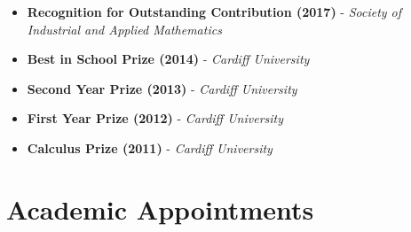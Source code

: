 \documentclass[10pt,a4paper,sans]{moderncv}        %
\begin{document}
		\begin{itemize}
			
			\item{\textbf{Recognition for Outstanding Contribution (2017)} - \small{\textit{Society of Industrial and Applied Mathematics}}}
			
			\vspace{6pt}
			
			\item{\textbf{Best in School Prize (2014)} - \small{\textit{Cardiff University}}}
			
			\vspace{6pt}
			
			\item{\textbf{Second Year Prize (2013)} - \small{\textit{Cardiff University}}}
			
			\vspace{6pt}
			
			\item{\textbf{First Year Prize (2012)} - \small{\textit{Cardiff University}}}
			
			\vspace{6pt}
			
			\item{\textbf{Calculus Prize (2011)} - \small{\textit{Cardiff University}}}
			
		\end{itemize}
	
	\vspace{10pt}
	
	\section{Academic Appointments}
	
	\vspace{6pt}
	
\end{document}
